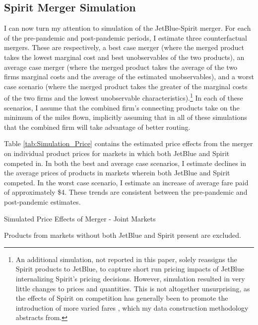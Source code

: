 \documentclass{article}
\begin{document}
	\subsection{Spirit Merger Simulation}
	\label{sec:Analysis_Merger}
	I can now turn my attention to simulation of the JetBlue-Spirit merger. For each of the pre-pandemic and post-pandemic periods, I estimate three counterfactual mergers. These are respectively, a best case merger (where the merged product takes the lowest marginal cost and best unobservables of the two products), an average case merger (where the merged product takes the average of the two firms marginal costs and the average of the estimated unobservables), and a worst case scenario (where the merged product takes the greater of the marginal costs of the two firms and the lowest unobservable characteristics).\footnote{An additional simulation, not reported in this paper, solely reassigns the Spirit products to JetBlue, to capture short run pricing impacts of JetBlue internalizing Spirit's pricing decisions. However, simulation resulted in very little changes to prices and quantities. This is not altogether unsurprising, as the effects of Spirit on competition has generally been to promote the introduction of more varied fares \citep{shrago_spirit_2024}, which my data construction methodology abstracts from.} In each of these scenarios, I assume that the combined firm's connecting products take on the minimum of the miles flown, implicitly assuming that in all of these simulations that the combined firm will take advantage of better routing. %

     
	 Table \ref{tab:Simulation_Price} contains the estimated price effects from the merger on individual product prices for markets in which both JetBlue and Spirit competed in. In both the best and average case scenarios, I estimate declines in the average prices of products in markets wherein both JetBlue and Spirit competed. In the worst case scenario, I estimate an increase of average fare paid of approximately \$4. These trends are consistent between the pre-pandemic and post-pandemic estimates.  
     
    \begin{table}
        \caption{Simulated Price Effects of Merger - Joint Markets}
        \label{tab:Simulation_Price}
                \vspace{-15mm}
        \begin{center}
         
         \footnotesize{Products from markets without both JetBlue and Spirit present are excluded.}
        \end{center}
     \end{table}
\end{document}
